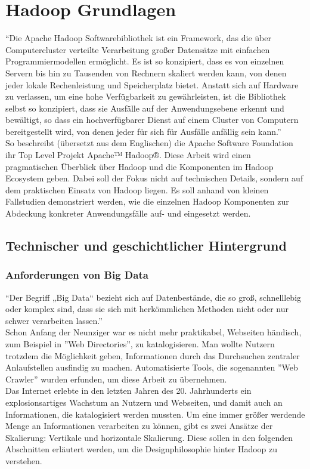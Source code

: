 \chapter{Hadoop Grundlagen}

``Die Apache Hadoop Softwarebibliothek ist ein Framework, das die über Computercluster verteilte Verarbeitung großer Datensätze mit einfachen Programmiermodellen ermöglicht. Es ist so konzipiert, dass es von einzelnen Servern bis hin zu Tausenden von Rechnern skaliert werden kann, von denen jeder lokale Rechenleistung und Speicherplatz bietet. Anstatt sich auf Hardware zu verlassen, um eine hohe Verfügbarkeit zu gewährleisten, ist die Bibliothek selbst so konzipiert, dass sie Ausfälle auf der Anwendungsebene erkennt und bewältigt, so dass ein hochverfügbarer Dienst auf einem Cluster von Computern bereitgestellt wird, von denen jeder für sich für Ausfälle anfällig sein kann.''\cite{noauthor_apache_nodate}\\
So beschreibt (übersetzt aus dem Englischen) die Apache Software Foundation ihr Top Level Projekt Apache™ Hadoop®. Diese Arbeit wird einen pragmatischen Überblick über Hadoop und die Komponenten im Hadoop Ecosystem geben. Dabei soll der Fokus nicht auf technischen Details, sondern auf dem praktischen Einsatz von Hadoop liegen. Es soll anhand von kleinen Fallstudien demonstriert werden, wie die einzelnen Hadoop Komponenten zur Abdeckung konkreter Anwendungsfälle auf- und eingesetzt werden.

\section{Technischer und geschichtlicher Hintergrund}
\subsection{Anforderungen von Big Data}
``Der Begriff „Big Data“ bezieht sich auf Datenbestände, die so groß, schnelllebig oder komplex sind, dass sie sich mit herkömmlichen Methoden nicht oder nur schwer verarbeiten lassen.''\cite{noauthor_big_nodate} \\ 
Schon Anfang der Neunziger war es nicht mehr praktikabel, Webseiten händisch, zum Beispiel in ''Web Directories'', zu katalogisieren. Man wollte Nutzern trotzdem die Möglichkeit geben, Informationen durch das Durchsuchen zentraler Anlaufstellen ausfindig zu machen. Automatisierte Tools, die sogenannten ''Web Crawler'' wurden erfunden, um diese Arbeit zu übernehmen.\cite{griffiths_search_2007} \\ 
Das Internet erlebte in den letzten Jahren des 20. Jahrhunderts ein explosionsartiges Wachstum an Nutzern und Webseiten, und damit auch an Informationen, die katalogisiert werden mussten.\cite{zakon_hobbes_2018} 
Um eine immer größer werdende Menge an Informationen verarbeiten zu können, gibt es zwei Ansätze der Skalierung: Vertikale und horizontale Skalierung. Diese sollen in den folgenden Abschnitten erläutert werden, um die Designphilosophie hinter Hadoop zu verstehen.

